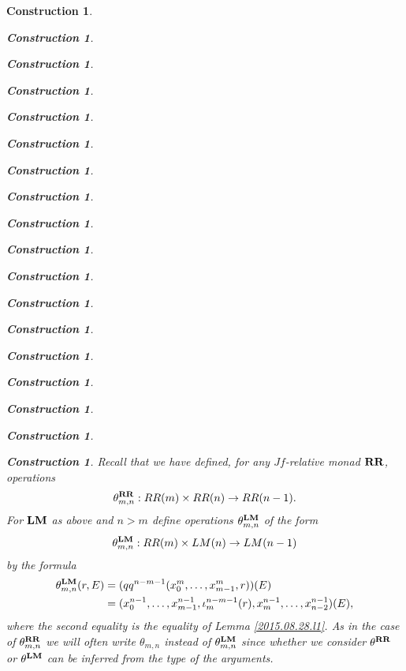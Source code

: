 \documentclass[onecolumn,12pt]{amsart}
\numberwithin{proposition}{subsection}
\newtheorem{construction}[proposition]{Construction}
\newcommand{\sr}{\rightarrow}
\newcommand{\RR}{{\bf RR}}
\newcommand{\LM}{{\bf LM}}
\begin{document}
\begin{construction}
\begin{construction}
\begin{construction}
\begin{construction}
\begin{construction}
\begin{construction}
\begin{construction}
\begin{construction}
\begin{construction}
\begin{construction}
\begin{construction}
\begin{construction}
\begin{construction}
\begin{construction}
\begin{construction}
\begin{construction}
\begin{construction}
\begin{construction}
Recall that we have defined, for any $Jf$-relative monad $\RR$, operations 
%
$$\theta^{\RR}_{m,n}:RR(m)\times RR(n)\sr RR(n-1).$$
% 
For $\LM$ as above and $n>m$ define operations $\theta^{\LM}_{m,n}$ of the form
%
$$\theta^{\LM}_{m,n}:RR(m)\times LM(n)\sr LM(n-1)$$
%
by the formula
%
\begin{equation}\label{2015.09.07.eq2}
  \begin{split}
    \theta^{\LM}_{m,n}(r,E)&=(qq^{n-m-1}(x_0^m,\dots,x_{m-1}^m,r))(E)\\
                          &=(x_0^{n-1},\dots,x_{m-1}^{n-1},\iota_m^{n-m-1}(r),x_m^{n-1},\dots, x_{n-2}^{n-1})(E),
  \end{split}
\end{equation}%
%
where the second equality is the equality of Lemma \ref{2015.08.28.l1}. As in
the case of $\theta^{\RR}_{m,n}$ we will often write $\theta_{m,n}$ instead of
$\theta^{\LM}_{m,n}$ since whether we consider $\theta^{\RR}$ or
$\theta^{\LM}$ can be inferred from the type of the arguments.


\end{construction}
\end{construction}
\end{construction}
\end{construction}
\end{construction}
\end{construction}
\end{construction}
\end{construction}
\end{construction}
\end{construction}
\end{construction}
\end{construction}
\end{construction}
\end{construction}
\end{construction}
\end{construction}
\end{construction}
\end{construction}
\end{document}
